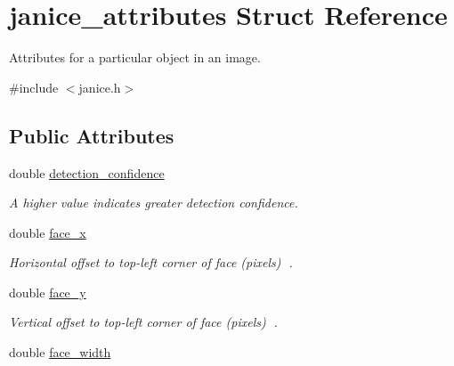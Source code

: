 \hypertarget{structjanice__attributes}{}\section{janice\+\_\+attributes Struct Reference}
\label{structjanice__attributes}


Attributes for a particular object in an image.  




{\ttfamily \#include $<$janice.\+h$>$}

\subsection*{Public Attributes}
\begin{DoxyCompactItemize}
\item 
\hypertarget{structjanice__attributes_a8f5d0b0051a574fc00267fc77f4b7e7e}{}double \hyperlink{structjanice__attributes_a8f5d0b0051a574fc00267fc77f4b7e7e}{detection\+\_\+confidence}\label{structjanice__attributes_a8f5d0b0051a574fc00267fc77f4b7e7e}

\begin{DoxyCompactList}\small\item\em A higher value indicates greater detection confidence. \end{DoxyCompactList}\item 
\hypertarget{structjanice__attributes_a62f236e140165065156d71a5bebb427b}{}double \hyperlink{structjanice__attributes_a62f236e140165065156d71a5bebb427b}{face\+\_\+x}\label{structjanice__attributes_a62f236e140165065156d71a5bebb427b}

\begin{DoxyCompactList}\small\item\em Horizontal offset to top-\/left corner of face (pixels) . \end{DoxyCompactList}\item 
\hypertarget{structjanice__attributes_a6d1095e735599b4cafb3b28aa674d15a}{}double \hyperlink{structjanice__attributes_a6d1095e735599b4cafb3b28aa674d15a}{face\+\_\+y}\label{structjanice__attributes_a6d1095e735599b4cafb3b28aa674d15a}

\begin{DoxyCompactList}\small\item\em Vertical offset to top-\/left corner of face (pixels) . \end{DoxyCompactList}\item 
\hypertarget{structjanice__attributes_a52549e9e1e0c09dde986d91787e753ee}{}double \hyperlink{structjanice__attributes_a52549e9e1e0c09dde986d91787e753ee}{face\+\_\+width}\label{structjanice__attributes_a52549e9e1e0c09dde986d91787e753ee}


\end{DoxyCompactItemize}
